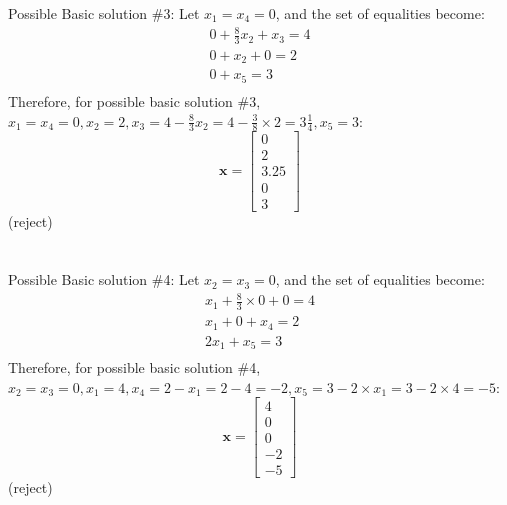 \documentclass[letter,12pt]{article}
\begin{document}
Possible Basic solution \#3:
Let $x_{1} = x_{4} = 0$, and the set of equalities become:
\begin{eqnarray*}
0 + \frac{8}{3}x_{2} + x_{3} = 4 \\
0 + x_{2} + 0 = 2 \\
0 + x_{5} = 3 \\
\end{eqnarray*}
Therefore, for possible basic solution \#3, $x_{1} = x_{4} = 0, x_{2} = 2, x_{3} = 4 - \frac{8}{3} x_{2} = 4 - \frac{3}{8} \times 2 = 3\frac{1}{4}, x_{5} = 3$:
\begin{equation}
\mathbf{x} = \left[
	\begin{array}{c}
	0 \\ 2 \\ 3.25 \\ 0 \\ 3
	\end{array}
	\right]
\end{equation}
(reject) \\
\ \\
\ \\

Possible Basic solution \#4:
Let $x_{2} = x_{3} = 0$, and the set of equalities become:
\begin{eqnarray*}
x_{1} + \frac{8}{3} \times 0 + 0 = 4 \\
x_{1} + 0 + x_{4} = 2 \\
2x_{1} + x_{5} = 3 \\
\end{eqnarray*}
Therefore, for possible basic solution \#4, $x_{2} = x_{3} = 0, x_{1} = 4, x_{4} = 2 - x_{1} = 2 - 4 = -2, x_{5}  = 3 - 2 \times x_{1} = 3 - 2 \times 4 = -5$:
\begin{equation}
\mathbf{x} = \left[
	\begin{array}{c}
	4 \\ 0 \\ 0 \\ -2 \\ -5
	\end{array}
	\right]
\end{equation}
(reject) \\
\ \\
\ \\
\end{document}

